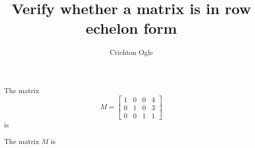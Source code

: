 \documentclass{ximera}
\title{Verify whether a matrix is in row echelon form}
\author{Crichton Ogle}
\begin{document}
\begin{question} The matrix
  \[M = \begin{bmatrix}
1 & 0 & 0 & 4\\
0 & 1 & 0 & 3\\
0 & 0 & 1 & 1
\end{bmatrix}\]
is
\begin{multipleChoice}
\end{multipleChoice}

\begin{question}
  The matrix $M$ is
  \begin{multipleChoice}
  \end{multipleChoice}
\end{question}
\end{question}
\end{document}
